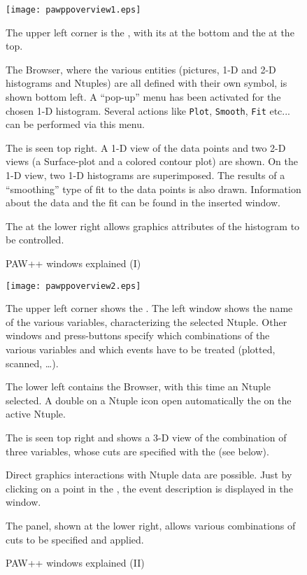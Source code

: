 \begin{figure}[p]
\begin{center}
\texttt{[image: pawppoverview1.eps]}
\end{center}
\small
\begin{UL}
\item The upper left corner is the \PAWPP{} \EW, with its \IP{}
      at the bottom and the \TP{} at the top.
\item The \PAWPP{} Browser, where the various entities (pictures, 1-D and
      2-D histograms and Ntuples) are all defined with their own symbol,
      is shown bottom left.  A ``pop-up'' menu has been activated for the 
      chosen 1-D histogram. Several actions like \texttt{Plot}, \texttt{Smooth},
      \texttt{Fit} etc... can be performed via this menu.
\item The \GW{} is seen top right. 
      A 1-D view of the data points and two 2-D views (a Surface-plot and a 
      colored contour plot) are shown.
      On the 1-D view, two 1-D histograms are 
      superimposed. The results of a ``smoothing'' type of fit to the data 
      points is also drawn. Information about the data and the fit can be found
      in the inserted window.
\item The \HSP{} at the lower right allows graphics
      attributes of the histogram to be controlled.
\end{UL}
\caption{PAW++ windows explained (I)}
\label{fig-pawppoverview1}
\end{figure}

\begin{figure}[p]
\begin{center}
\texttt{[image: pawppoverview2.eps]}
\end{center}
\small
\begin{UL}
\item The upper left corner shows the \NV.
      The left window shows the name of the various variables, characterizing
      the selected Ntuple. Other windows and press-buttons specify which
      combinations of the various variables and which events
      have to be treated (plotted, scanned, \ldots).
\item The lower left contains the \PAWPP{} Browser, with this time an Ntuple
      selected. A double on a Ntuple icon
      open automatically the \NV{} on the active Ntuple.
\item The \GW{} is seen top right and shows a 3-D view
      of the combination of three variables, whose cuts are
      specified with the \CE{} (see below).
\item Direct graphics interactions with Ntuple data are possible. Just
      by clicking on a point in the  \GW, the event description is displayed
      in the \PL{} window.
\item The \CE{} panel, shown at the lower right, allows
      various combinations of cuts to be specified and applied.
\end{UL}
\caption{PAW++ windows explained (II)}
\label{fig-pawppoverview2}
\end{figure}

